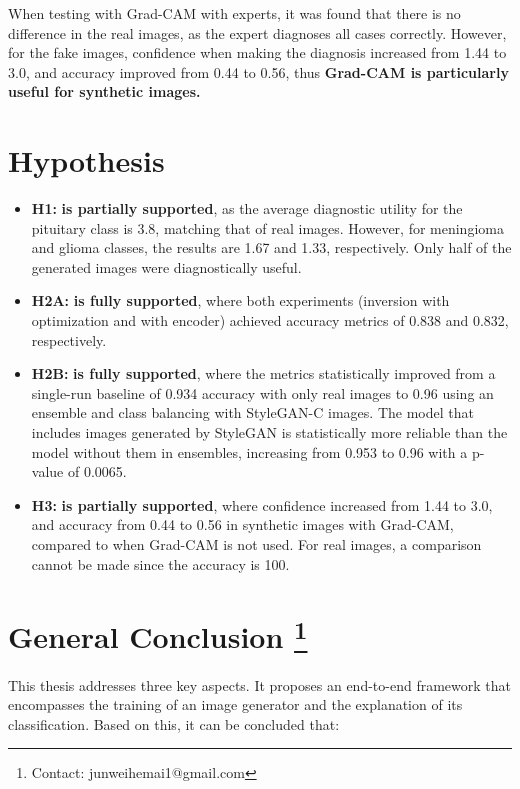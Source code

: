 When testing with Grad-CAM with experts, it was found that there is no difference in the real images, as the expert diagnoses all cases correctly. However, for the fake images, confidence when making the diagnosis increased from 1.44 to 3.0, and accuracy improved from 0.44 to 0.56, thus \textbf{Grad-CAM is particularly useful for synthetic images.}

\section{Hypothesis}


\begin{itemize}

    \item \textbf{H1:} \textbf{is partially supported}, as the average diagnostic utility for the pituitary class is 3.8, matching that of real images. However, for meningioma and glioma classes, the results are 1.67 and 1.33, respectively. Only half of the generated images were diagnostically useful.

    
    \item \textbf{H2A:} \textbf{is fully supported}, where both experiments (inversion with optimization and with encoder) achieved accuracy metrics of 0.838 and 0.832, respectively.
    
    \item \textbf{H2B:} \textbf{is fully supported}, where the metrics statistically improved from a single-run baseline of 0.934 accuracy with only real images to 0.96 using an ensemble and class balancing with StyleGAN-C images. The model that includes images generated by 
    StyleGAN is statistically more reliable than the model without them in ensembles, increasing from 0.953 to 0.96 with a p-value of 0.0065.
    
    \item \textbf{H3:} \textbf{is partially supported}, where confidence increased from 1.44 to 3.0, and accuracy from 0.44 to 0.56 in synthetic images with Grad-CAM, compared to when Grad-CAM is not used. For real images, a comparison cannot be made since the accuracy is 100.
\end{itemize}

\section*{General Conclusion \footnote{Contact: junweihemai1@gmail.com}}

This thesis addresses three key aspects. It proposes an end-to-end framework that encompasses the training of an image generator and the explanation of its classification. Based on this, it can be concluded that:

